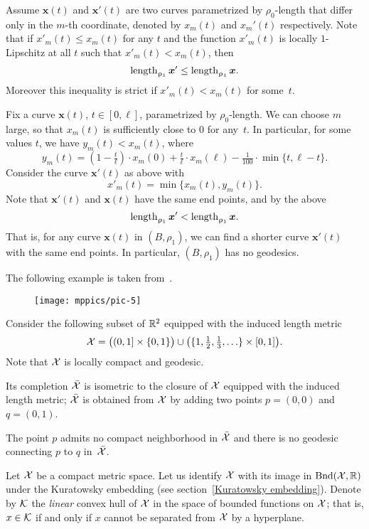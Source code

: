 Assume $\bm{x}(t)$ and $\bm{x}'(t)$ are two curves parametrized by $\rho_0$-length that differ only in the $m$-th coordinate, denoted by $x_m(t)$ and $x_m'(t)$ respectively.
Note that if $x'_m(t)\le x_m(t)$ for any $t$ and 
the function $x'_m(t)$ is locally $1$-Lipschitz at all $t$ such that $x'_m(t)< x_m(t)$, then 
\[\length_{\rho_1}\bm{x}'\le \length_{\rho_1}\bm{x}.\]
Moreover this inequality is strict if $x'_m(t)< x_m(t)$ for some~$t$.

Fix a curve $\bm{x}(t)$, $t\in[0,\ell]$, parametrized by  $\rho_0$-length.
We can choose $m$ large, so that $x_m(t)$ is sufficiently close to $0$ for any~$t$.
In particular, for some values $t$, we have $y_m(t)<x_m(t)$, where
\[y_m(t)=(1-\tfrac t\ell)\cdot x_m(0)
+\tfrac t\ell\cdot x_m(\ell)
-\tfrac 1{100}\cdot \min\{t,\ell-t\}.\]
Consider the curve $\bm{x}'(t)$ as above with
\[x'_m(t)=\min\{x_m(t),y_m(t)\}.\]
Note that $\bm{x}'(t)$ and $\bm{x}(t)$ have the same end points, and by the above
\[\mathop{\rm length}\nolimits_{\upvarrho_1}\bm{x}'<\mathop{\rm length}\nolimits_{\upvarrho_1}\bm{x}.\]
That is, for any curve $\bm{x}(t)$ in $(B,\rho_1)$, we can find a shorter curve $\bm{x}'(t)$ with the same end points.
In particular, $(B,\rho_1)$ has no geodesics.

The following example is taken from~\cite{bridson-haefliger}.

\medskip

\begin{wrapfigure}{r}{20 mm}
\vskip-0mm
\centering
\texttt{[image: mppics/pic-5]}
\end{wrapfigure}

Consider the following subset of $\mathbb{R}^2$ equipped with the induced length metric
\[
\spc{X}
=
\bigl((0,1]\times\{0,1\}\bigr)
\cup
\bigl(\{1,\tfrac12,\tfrac13,\dots\}\times[0,1]\bigr).
\]
Note that $\mathcal{X}$ is locally compact and geodesic.

Its completion $\bar{\mathcal{X}}$ is isometric to the closure of $\mathcal{X}$ equipped with the induced length metric;
$\bar{\mathcal{X}}$ is obtained from $\mathcal{X}$ by adding two points $p=(0,0)$ and $q=(0,1)$.

The point $p$ admits no compact neighborhood in $\bar{\mathcal{X}}$ 
and there is no geodesic connecting $p$ to $q$ in~$\bar{\mathcal{X}}$. \qeds 

\parbf{\ref{ex:compact-in-lenght}}
Let $\mathcal{X}$ be a compact metric space.
Let us identify $\mathcal{X}$ with its image in $\mathrm{Bnd}(\mathcal{X},\mathbb{R})$ under the Kuratowsky embedding (see section~\ref{Kuratowsky embedding}). 
Denote by $\mathcal{K}$ the \emph{linear} convex hull of $\mathcal{X}$ in the space of bounded functions on $\mathcal{X}$; 
that is, $x\in \spc{K}$ if and only if $x$ cannot be separated from $\mathcal{X}$ by a hyperplane.

